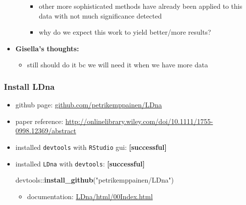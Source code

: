 \documentclass[letterpaper]{scrartcl}
\newenvironment{Shaded}{}{}
\newcommand{\KeywordTok}[1]{\textcolor[rgb]{0.00,0.44,0.13}{\textbf{{#1}}}}
\newcommand{\StringTok}[1]{\textcolor[rgb]{0.25,0.44,0.63}{{#1}}}
\newcommand{\NormalTok}[1]{{#1}}
\begin{document}
\begin{itemize}
\begin{itemize}
    \begin{itemize}
    \itemsep1pt\parskip0pt
    \item
      other more sophisticated methods have already been applied to this
      data with not much significance detected
    \item
      why do we expect this work to yield better/more results?
    \end{itemize}
  \end{itemize}
\item
  \textbf{Gisella's thoughts:}

  \begin{itemize}
  \itemsep1pt\parskip0pt
  \item
    still should do it bc we will need it when we have more data
  \end{itemize}
\end{itemize}

\subsubsection{Install LDna}\label{install-ldna}

\begin{itemize}
\item
  github page:
  \href{https://github.com/petrikemppainen/LDna}{github.com/petrikemppainen/LDna}
\item
  paper reference:
  \url{http://onlinelibrary.wiley.com/doi/10.1111/1755-0998.12369/abstract}
\item
  installed \texttt{devtools} with \texttt{RStudio} gui:
  \textbf{{[}successful{]}}
\item
  installed \texttt{LDna} with \texttt{devtools}:
  \textbf{{[}successful{]}}

\begin{Shaded}
\begin{Highlighting}[]
\NormalTok{devtools::}\KeywordTok{install_github}\NormalTok{(}\StringTok{"petrikemppainen/LDna"}\NormalTok{)}
\end{Highlighting}
\end{Shaded}

  \begin{itemize}
  \itemsep1pt\parskip0pt
  \item
    documentation:
    \href{file:///home/gus/R/x86_64-unknown-linux-gnu-library/3.1/LDna/html/00Index.html}{LDna/html/00Index.html}
  \end{itemize}
\end{itemize}
\end{document}

